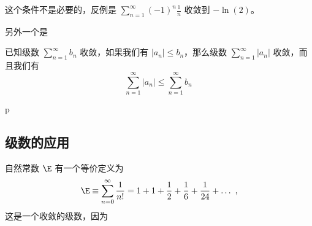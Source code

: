这个条件不是必要的，反例是 $\sum_{n = 1}^\infty (-1)^n\frac1{n}$ 收敛到 $-\ln(2)$。

另外一个是
\begin{theorem}{}
已知级数 $\sum_{n=1}^\infty b_n$ 收敛，如果我们有 $|a_n| \leq b_n$，那么级数 $\sum_{n=1}^\infty |a_n|$ 收敛，而且我们有
$$
\sum_{n=1}^\infty |a_n| \leq \sum_{n=1}^\infty b_n ~
$$
\end{theorem}

p








\subsection{级数的应用}



自然常数 $\E$ 有一个等价定义为
\begin{equation}
\E \equiv \sum_{n=0}^\infty \frac{1}{n!} = 1 + 1 + \frac{1}{2} + \frac{1}{6} + \frac{1}{24} +\dots~,
\end{equation}
这是一个收敛的级数，因为
